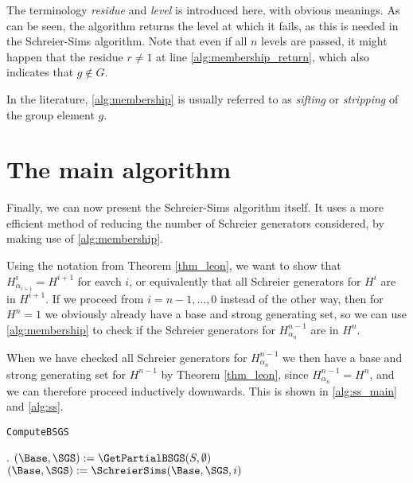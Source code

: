 The terminology \emph{residue} and \emph{level} is introduced here,
with obvious meanings. As can be seen, the algorithm returns the level
at which it fails, as this is needed in the Schreier-Sims algorithm. Note that even if all $n$ levels are passed, it might happen that the residue $r \neq 1$ at line \ref{alg:membership_return}, which also indicates that $g \notin G$. 

In the literature, \ref{alg:membership} is usually referred to as
\emph{sifting} or \emph{stripping} of the group element $g$.

\section{The main algorithm}
Finally, we can now present the Schreier-Sims algorithm itself. It
uses a more efficient method of reducing the number of Schreier
generators considered, by making use of \ref{alg:membership}. 

Using
the notation from Theorem \ref{thm_leon}, we want to show that
$H^i_{\alpha_{i + 1}} = H^{i + 1}$ for eavch $i$, or equivalently that
all Schreier generators for $H^i$ are in $H^{i + 1}$. If we proceed
from $i = n - 1, \dotsc, 0$ instead of the other way, then for $H^n = 1$ we obviously already have a base and strong generating set,
so we can use \ref{alg:membership} to check if the Schreier generators
for $H^{n - 1}_{\alpha_n}$ are in $H^n$.

When we have checked all Schreier generators for $H^{n - 1}_{\alpha_n}$ we then have a
base and strong generating set for $H^{n - 1}$ by Theorem \ref{thm_leon},
since $H^{n - 1}_{\alpha_n} = H^n$, and we can therefore proceed
inductively downwards. This is shown in \ref{alg:ss_main} and \ref{alg:ss}.

\begin{algorithm} 
\dontprintsemicolon
\caption{\texttt{ComputeBSGS}}
.
\Begin
{
  $(\Base, \SGS) := \GetPartialBSGS(S, \emptyset)$ \;
  {
    $(\Base, \SGS) := \SchreierSims(\Base, \SGS, i)$ \;
  }
  \Return{$(\Base, \SGS)$}
}
\label{alg:ss_main}
\end{algorithm}

